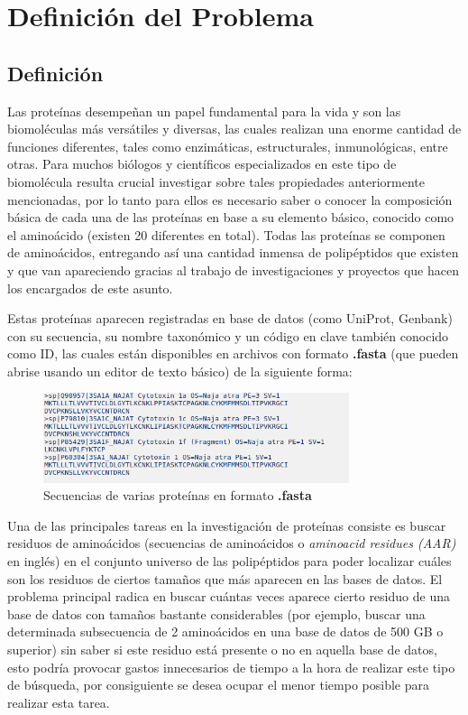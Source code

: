 \chapter{Definici\'on del Problema}

\section{Definición}

Las proteínas desempeñan un papel fundamental para la vida y son las biomoléculas más versátiles y diversas, las cuales realizan una enorme cantidad de funciones diferentes, tales como enzimáticas, estructurales, inmunológicas, entre otras. Para muchos biólogos y científicos especializados en este tipo de biomolécula resulta crucial investigar sobre tales propiedades anteriormente mencionadas, por lo tanto para ellos es necesario saber o conocer la composición básica de cada una de las proteínas en base a su elemento básico, conocido como el aminoácido (existen 20 diferentes en total). Todas las proteínas se componen de aminoácidos, entregando así una cantidad inmensa de polipéptidos que existen y que van apareciendo gracias al trabajo de investigaciones y proyectos que hacen los encargados de este asunto.

Estas proteínas aparecen registradas en base de datos (como UniProt, Genbank) con su secuencia, su nombre taxonómico y un código en clave también conocido como ID, las cuales están disponibles en archivos con formato \textbf{.fasta} (que pueden abrise usando un editor de texto básico) de la siguiente forma:

\newpage

\begin{figure}[ht]
    \centering
    \includegraphics[width=0.8\textwidth]{./images/secuencias.png}
    \caption{Secuencias de varias proteínas en formato \textbf{.fasta}}
    \label{fig:image4}
\end{figure}

Una de las principales tareas en la investigación de proteínas consiste es buscar residuos de aminoácidos (secuencias de aminoácidos o \textit{aminoacid residues (AAR)} en inglés) en el conjunto universo de las polipéptidos para poder localizar cuáles son los residuos de ciertos tamaños que más aparecen en las bases de datos. El problema principal radica en buscar cuántas veces aparece cierto residuo de una base de datos con tamaños bastante considerables (por ejemplo, buscar una determinada subsecuencia de 2 aminoácidos en una base de datos de 500 GB o superior) sin saber si este residuo está presente o no en aquella base de datos, esto podría provocar gastos innecesarios de tiempo a la hora de realizar este tipo de búsqueda, por consiguiente se desea ocupar el menor tiempo posible para realizar esta tarea.

